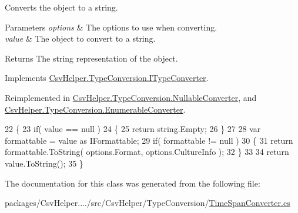 Converts the object to a string. 


\begin{DoxyParams}{Parameters}
{\em options} & The options to use when converting.\\
\hline
{\em value} & The object to convert to a string.\\
\hline
\end{DoxyParams}
\begin{DoxyReturn}{Returns}
The string representation of the object.
\end{DoxyReturn}


Implements \hyperlink{a00099_a90c465c63dbcf913f38aa878f35e77c7}{Csv\-Helper.\-Type\-Conversion.\-I\-Type\-Converter}.



Reimplemented in \hyperlink{a00116_a7205cdb61d2d119582958232b3e63109}{Csv\-Helper.\-Type\-Conversion.\-Nullable\-Converter}, and \hyperlink{a00078_a7e07e9532857d748654d37db590a0e11}{Csv\-Helper.\-Type\-Conversion.\-Enumerable\-Converter}.


\begin{DoxyCode}
22         \{
23             \textcolor{keywordflow}{if}( value == null )
24             \{
25                 \textcolor{keywordflow}{return} string.Empty;
26             \}
27 
28             var formattable = value as IFormattable;
29             \textcolor{keywordflow}{if}( formattable != null )
30             \{
31                 \textcolor{keywordflow}{return} formattable.ToString( options.Format, options.CultureInfo );
32             \}
33 
34             \textcolor{keywordflow}{return} value.ToString();
35         \}
\end{DoxyCode}


The documentation for this class was generated from the following file\-:\begin{DoxyCompactItemize}
\item 
packages/\-Csv\-Helper..../src/\-Csv\-Helper/\-Type\-Conversion/\hyperlink{a00244}{Time\-Span\-Converter.\-cs}\end{DoxyCompactItemize}
